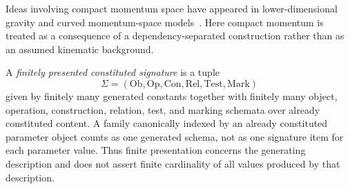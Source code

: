 \documentclass[12pt,a4paper]{article}
\begin{document}
Ideas involving compact momentum space have appeared in lower-dimensional
gravity and curved momentum-space models~\cite{tHooft1996}.  Here compact
momentum is treated as a consequence of a dependency-separated construction
rather than as an assumed
kinematic background.


\begin{definition}
\label{p2:def:finite-presentation-convention}
A \emph{finitely presented constituted signature} is a tuple
\[
 \Sigma=(\mathrm{Ob},\mathrm{Op},\mathrm{Con},\mathrm{Rel},\mathrm{Test},\mathrm{Mark})
\]
given by finitely many generated constants together with finitely many object,
operation, construction, relation, test, and marking schemata over already
constituted content.  A family canonically indexed by an already constituted
parameter object counts as one generated schema, not as one signature item for
each parameter value.  Thus finite presentation concerns the generating
description and does not assert finite cardinality of all values produced by
that description.
\end{definition}
\end{document}
